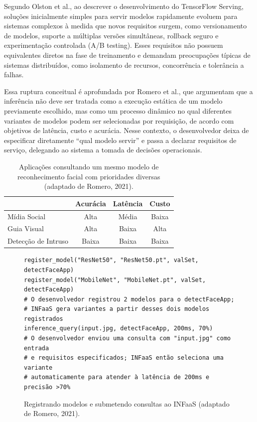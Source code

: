 Segundo Olston et al., ao descrever o desenvolvimento do TensorFlow Serving, soluções inicialmente simples para servir modelos rapidamente evoluem para sistemas complexos à medida que novos requisitos surgem, como versionamento de modelos, suporte a múltiplas versões simultâneas, rollback seguro e experimentação controlada (A/B testing). Esses requisitos não possuem equivalentes diretos na fase de treinamento e demandam preocupações típicas de sistemas distribuídos, como isolamento de recursos, concorrência e tolerância a falhas.

Essa ruptura conceitual é aprofundada por Romero et al., que argumentam que a inferência não deve ser tratada como a execução estática de um modelo previamente escolhido, mas como um processo dinâmico no qual diferentes variantes de modelos podem ser selecionadas por requisição, de acordo com objetivos de latência, custo e acurácia. Nesse contexto, o desenvolvedor deixa de especificar diretamente “qual modelo servir” e passa a declarar requisitos de serviço, delegando ao sistema a tomada de decisões operacionais.

\begin{table}[htbp]
  \centering
  \caption{Aplicações consultando um mesmo modelo de reconhecimento facial com prioridades diversas (adaptado de Romero, 2021).}
  \label{tab:metrics}

  \begin{tabular}{@{}lccc@{}}
    \toprule
    & \textbf{Acurácia} & \textbf{Latência} & \textbf{Custo} \\ \midrule
    Mídia Social     & Alta   & Média & Baixa   \\
    Guia Visual      & Alta   & Baixa & Alta  \\
    Detecção de Intruso & Baixa & Baixa & Baixa   \\
    \bottomrule
  \end{tabular}
\end{table}

\begin{figure}[htbp]
  \centering
  \begin{verbatim}
register_model("ResNet50", "ResNet50.pt", valSet, detectFaceApp)
register_model("MobileNet", "MobileNet.pt", valSet, detectFaceApp)
# O desenvolvedor registrou 2 modelos para o detectFaceApp;
# INFaaS gera variantes a partir desses dois modelos registrados
inference_query(input.jpg, detectFaceApp, 200ms, 70%)
# O desenvolvedor enviou uma consulta com "input.jpg" como entrada
# e requisitos especificados; INFaaS então seleciona uma variante
# automaticamente para atender à latência de 200ms e precisão >70%
  \end{verbatim}
  \vspace{-1.0cm}
  \caption{Registrando modelos e submetendo consultas ao INFaaS (adaptado de Romero, 2021).}
  \label{fig:infass-code}
\end{figure}

